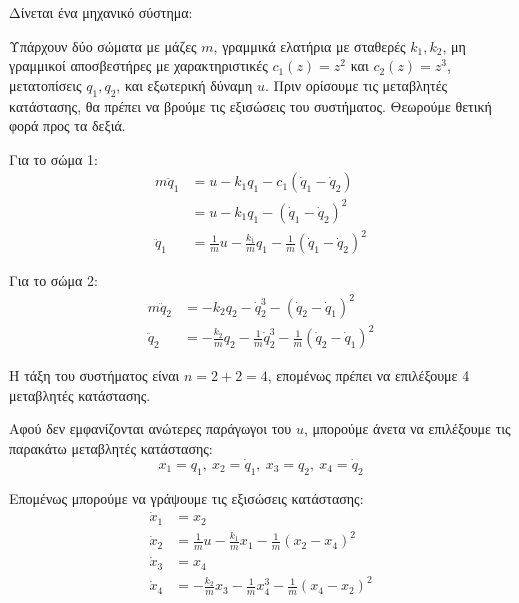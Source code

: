 \documentclass[11pt,a4paper,notitlepage,fleqn]{article}
\let\mytodo\todo
\renewcommand{\todo}[1]{\par\mytodo[inline,noline]{#1}}
\begin{document}
\begin{exercise}
	Δίνεται ένα μηχανικό σύστημα:
	\todo{Graph 32}
	
	Υπάρχουν δύο σώματα με μάζες \( m \), γραμμικά ελατήρια με σταθερές
	\( k_1,k_2 \), μη γραμμικοί αποσβεστήρες με χαρακτηριστικές
	\( c_1(z) = z^2 \) και \( c_2(z) = z^3 \), μετατοπίσεις
	\( q_1,q_2 \), και εξωτερική δύναμη \( u \).
	\tcblower
	Πριν ορίσουμε τις μεταβλητές κατάστασης, θα πρέπει να βρούμε τις
	εξισώσεις του συστήματος. Θεωρούμε θετική φορά προς τα δεξιά.
	
	Για το σώμα 1:
	\begin{align*}
		m\ddot q_1 &=
		u - k_1q_1 - c_1(\dot q_1 -\dot q_2)
		\\ &= u-k_1q_1 - (\dot q_1 - \dot q_2)^2 \\
		\ddot q_1 &=
		\frac{1}{m}u - \frac{k_1}{m}q_1 - \frac{1}{m}(\dot q_1 -\dot q_2)^2
	\end{align*}
	
	Για το σώμα 2:
	\begin{align*}
	m\ddot q_2 &= -k_2q_2 - \dot q_2^3
	- (\dot q_2 - \dot q_1)^2 \\
	\ddot q_2 &= -\frac{k_2}{m}q_2 - \frac{1}{m}\dot q_2^3
	- \frac{1}{m}(\dot q_2 - \dot q_1)^2
	\end{align*}
	
	Η τάξη του συστήματος είναι \( n=2+2=4 \), επομένως πρέπει να επιλέξουμε 4 μεταβλητές κατάστασης.
	
	Αφού δεν εμφανίζονται ανώτερες παράγωγοι του \( u \), μπορούμε
	άνετα να επιλέξουμε τις παρακάτω μεταβλητές κατάστασης:
	\[
	x_1=q_1,\ x_2 = \dot q_1,\ x_3 = q_2,\ x_4 = \dot q_2
	\]
	
	Επομένως μπορούμε να γράψουμε τις εξισώσεις κατάστασης:
	\begin{align*}
		\dot x_1 &= x_2 \\
		\dot x_2 &= \frac{1}{m} u -\frac{k_1}{m}x_1
		-\frac{1}{m}(x_2-x_4)^2 \\
		\dot x_3 &= x_4 \\
		\dot x_4 &= -\frac{k_2}{m}x_3 - \frac{1}{m}x_4^3-\frac{1}{m}(x_4-x_2)^2
	\end{align*}
\end{exercise}
\end{document}
